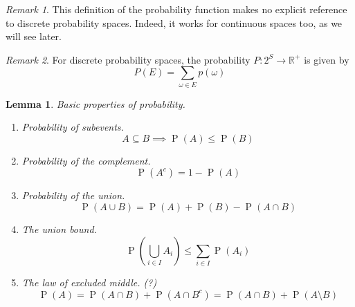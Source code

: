 \documentclass[11pt,letterpaper]{article}
\newtheorem{lem}{Lemma}
\theoremstyle{definition}
\theoremstyle{remark}
\newtheorem{rem}{Remark}[section]
\newcommand{\parens}[1]{\left(#1\right)}
\newcommand{\Union}{\bigcup}
\newcommand{\union}{\cup}
\newcommand{\intersn}{\cap}
\newcommand{\R}{\mathbb{R}}
\DeclareMathOperator{\Prob}{P}
\renewcommand{\P}[1]{\Prob{\parens{#1}}}
\begin{document}
\begin{rem}
    This definition of the probability function makes no explicit reference to
    discrete probability spaces. Indeed, it works for continuous spaces too, as
    we will see later.
\end{rem}

\begin{rem}
    For discrete probability spaces, the probability $P : 2^S \to \R^+$ is
    given by
    \begin{equation*}
        P(E) = \sum_{\omega \in E} p(\omega)
    \end{equation*}
\end{rem}

\begin{lem}
    Basic properties of probability.

    \begin{enumerate}
        \item Probability of subevents.
            \begin{equation*}
                A \subseteq B \implies \P{A} \leq \P{B}
            \end{equation*}

        \item Probability of the complement.
            \begin{equation*}
                \label{eq:complement-probability}
                \P{A^c} = 1 - \P{A}
            \end{equation*}

        \item Probability of the union.
            \begin{equation*}
                \P{A \union B} = \P{A} + \P{B} - \P{A \intersn B}
            \end{equation*}

        \item The union bound.
            \begin{equation}
                \label{eq:union-bound}
                \P{\Union_{i \in I} A_i} \leq \sum_{i \in I} \P{A_i}
            \end{equation}

        \item The law of excluded middle. (?)
            \begin{equation}
                \label{eq:excluded-middle}
                \P{A}
                = \P{A \intersn B} + \P{A \intersn B^c}
                = \P{A \intersn B} + \P{A \setminus B}
            \end{equation}
    \end{enumerate}
\end{lem}
\end{document}
